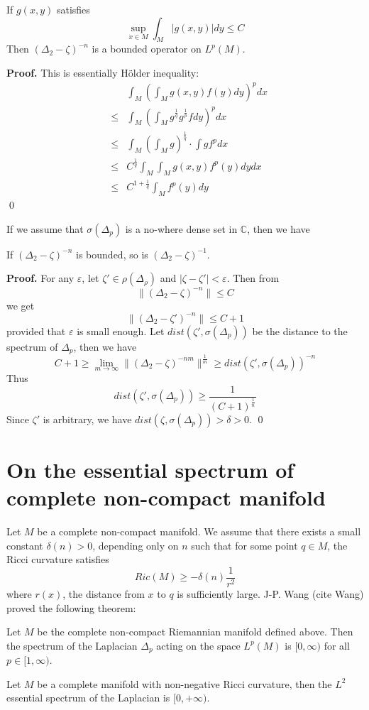 \begin{lemma}
If $g(x,y)$ satisfies
\[
\sup_{x\in M}\int_M |g(x,y)|dy \leqslant C
\]
Then $(\Delta_2 - \zeta)^{-n}$ is a bounded operator on $L^p(M)$.
\end{lemma}
{\bf Proof.}
This is essentially H\"{o}lder inequality:
\begin{eqnarray}
\nonumber & & \int_M \left(\int_M g(x,y)f(y)dy\right)^p dx \\
\nonumber & \leqslant 
& \int_M \left(\int_M g^{\frac{1}{q}}g^{\frac{1}{p}}fdy\right)^p dx \\
\nonumber & \leqslant & \int_M\left(\int_M g\right)^{\frac{1}{q}} \cdot 
\int gf^p dx \\
\nonumber & \leqslant & C^{\frac{1}{q}} \int_M\int_M g(x,y)f^p(y)dydx \\
\nonumber & \leqslant & C^{1+\frac{1}{q}}\int_M f^p(y)dy
\end{eqnarray}
\qed

If we assume that $\sigma(\Delta_p)$ is a no-where dense set in $\mathbb{C}$,
then we have
\begin{lemma}
If $(\Delta_2 - \zeta)^{-n}$ is bounded, so is $(\Delta_2 - \zeta)^{-1}$.
\end{lemma}
{\bf Proof.}
For any $\varepsilon$, let $\zeta '\in\rho(\Delta_\rho)$ and 
$|\zeta - \zeta '| < \varepsilon$. Then from
\[
\|(\Delta_2 - \zeta)^{-n}\| \leqslant C
\]
we get
\[
\|(\Delta_2 - \zeta ')^{-n}\| \leqslant C+1
\]
provided that $\varepsilon$ is small enough. Let 
$dist(\zeta ', \sigma(\Delta_p))$ be the distance to the spectrum of $\Delta_p$,
then we have
\[
C+1 \geqslant \lim_{m\rightarrow \infty} \|(\Delta_2 - 
\zeta)^{-nm}\|^{\frac{1}{m}} \geqslant dist(\zeta ', \sigma(\Delta_p))^{-n}
\]
Thus
\[
dist(\zeta ', \sigma(\Delta_p)) \geqslant \frac{1}{(C+1)^{\frac{1}{n}}}
\]
Since $\zeta '$ is arbitrary, we have 
$dist(\zeta, \sigma(\Delta_p)) > \delta > 0$.
\qed
\section{On the essential spectrum of complete non-compact manifold}\label{Spec_II}
Let  $M$ be a complete non-compact manifold.
We assume that  there exists a small constant $\delta(n) > 0$, depending only on
$n$ such that for some point $q\in M$, the Ricci curvature satisfies
\[
Ric(M) \geqslant -\delta(n)\frac{1}{r^2}
\]
where $r(x)$, the distance from $x$ to $q$ is sufficiently large.
J-P. Wang (cite Wang) proved the following theorem:
\begin{theorem}
Let $M$ be the complete non-compact Riemannian manifold defined above. Then the spectrum of the
Laplacian $\Delta_p$ acting on the space $L^p(M)$ is $[0, \infty)$ for all
$p\in[1,\infty)$.
\end{theorem}
\begin{corollary}
Let $M$ be a complete manifold with non-negative Ricci curvature, then the $L^2$
essential spectrum of the Laplacian is $[0, +\infty)$.
\end{corollary}



